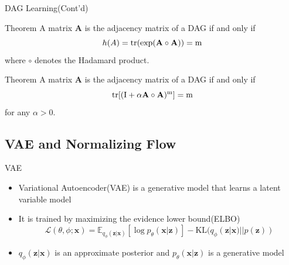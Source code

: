 \documentclass{beamer}
\begin{document}
\begin{frame}{DAG Learning(Cont'd)}
    \begin{block}{Theorem}
        A matrix $\mathbf A$ is the adjacency matrix of a DAG if and only if
        \begin{equation*}
            h(A) = \rm{tr}(\exp(\mathbf A \circ \mathbf A)) = m
        \end{equation*}
        where $\circ$ denotes the Hadamard product.
    \end{block}
    \begin{block}{Theorem}
        A matrix $\mathbf A$ is the adjacency matrix of a DAG if and only if
        \begin{equation*}
            \rm{tr}[(I + \alpha \mathbf A \circ \mathbf A)^m] = m
        \end{equation*}
        for any $\alpha>0$.
    \end{block}
\end{frame}

\subsection*{VAE and Normalizing Flow}

\begin{frame}{VAE}
    \begin{itemize}
        \item Variational Autoencoder(VAE) is a generative model that learns a latent variable model
        \item It is trained by maximizing the evidence lower bound(ELBO)
        \begin{equation}
            \mathcal L(\theta, \phi; \mathbf x) = \mathbb E_{q_\phi(\mathbf z | \mathbf x)}[\log p_\theta(\mathbf x | \mathbf z)] - \text{KL}(q_\phi(\mathbf z | \mathbf x) || p(\mathbf z))
        \end{equation}
        \item $q_\phi(\mathbf z | \mathbf x)$ is an approximate posterior and $p_\theta(\mathbf x | \mathbf z)$ is a generative model
    \end{itemize}
\end{frame}
\end{document}
